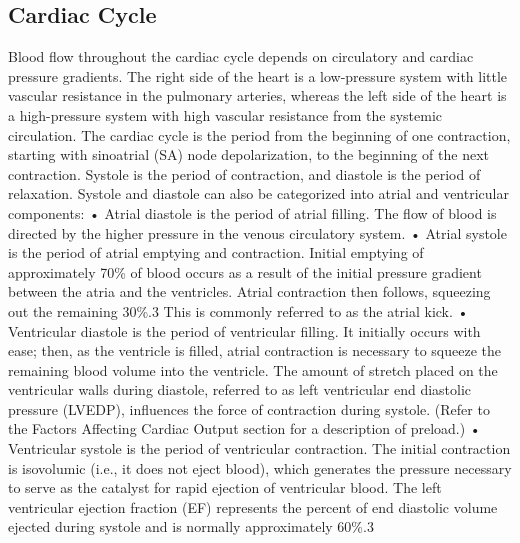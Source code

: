 \subsection{Cardiac Cycle}
Blood flow throughout the cardiac cycle depends on circulatory and cardiac pressure gradients. The right side of the heart is a low-pressure system with little vascular resistance in the pulmonary arteries, whereas the left side of the heart is a high-pressure system with high vascular resistance from the systemic circulation. The cardiac cycle is the period from the beginning of one contraction, starting with sinoatrial (SA) node depolarization, to the beginning of the next contraction. Systole is the period of contraction, and diastole is the period of relaxation. Systole and diastole can also be categorized into atrial and ventricular components:
•	Atrial diastole is the period of atrial filling. The flow of blood is directed by the higher pressure in the venous circulatory system.
•	Atrial systole is the period of atrial emptying and contraction. Initial emptying of approximately 70\% of blood occurs as a result of the initial pressure gradient between the atria and the ventricles. Atrial contraction then follows, squeezing out the remaining 30\%.3 This is commonly referred to as the atrial kick.
•	Ventricular diastole is the period of ventricular filling. It initially occurs with ease; then, as the ventricle is filled, atrial contraction is necessary to squeeze the remaining blood volume into the ventricle. The amount of stretch placed on the ventricular walls during diastole, referred to as left ventricular end diastolic pressure (LVEDP), influences the force of contraction during systole. (Refer to the Factors Affecting Cardiac Output section for a description of preload.)
•	Ventricular systole is the period of ventricular contraction. The initial contraction is isovolumic (i.e., it does not eject blood), which generates the pressure necessary to serve as the catalyst for rapid ejection of ventricular blood. The left ventricular ejection fraction (EF) represents the percent of end diastolic volume ejected during systole and is normally approximately 60\%.3

